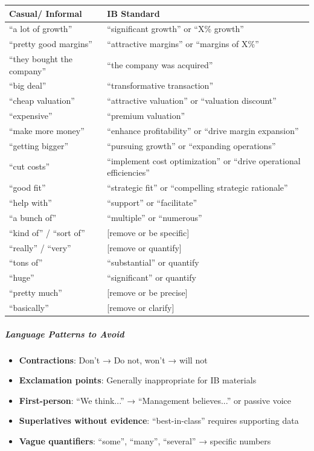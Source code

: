\documentclass[11pt]{article}
\begin{document}
\begingroup
\small
\setlength{\tabcolsep}{2pt}
\begin{longtable}{>{\RaggedRight\arraybackslash\hspace{0pt}}p{}>{\RaggedRight\arraybackslash\hspace{0pt}}p{}}
\toprule
{} \textbf{Casual/ Informal} & \textbf{IB Standard} \\
\midrule
{} ``a lot of growth'' & ``significant growth'' or ``X\% growth'' \\
{} ``pretty good margins'' & ``attractive margins'' or ``margins of X\%'' \\
{} ``they bought the company'' & ``the company was acquired'' \\
{} ``big deal'' & ``transformative transaction'' \\
{} ``cheap valuation'' & ``attractive valuation'' or ``valuation discount'' \\
{} ``expensive'' & ``premium valuation'' \\
{} ``make more money'' & ``enhance profitability'' or ``drive margin expansion'' \\
{} ``getting bigger'' & ``pursuing growth'' or ``expanding operations'' \\
{} ``cut costs'' & ``implement cost optimization'' or ``drive operational efficiencies'' \\
{} ``good fit'' & ``strategic fit'' or ``compelling strategic rationale'' \\
{} ``help with'' & ``support'' or ``facilitate'' \\
{} ``a bunch of'' & ``multiple'' or ``numerous'' \\
{} ``kind of'' /  ``sort of'' & [remove or be specific] \\
{} ``really'' /  ``very'' & [remove or quantify] \\
{} ``tons of'' & ``substantial'' or quantify \\
{} ``huge'' & ``significant'' or quantify \\
{} ``pretty much'' & [remove or be precise] \\
{} ``basically'' & [remove or clarify] \\
\bottomrule
\end{longtable}
\endgroup

\subparagraph{Language Patterns to Avoid}\mbox{}\par

\begin{itemize}[leftmargin=*,itemsep=2pt,topsep=2pt]
\item {} \textbf{Contractions}: Don't → Do not, won't → will not
\item {} \textbf{Exclamation points}: Generally inappropriate for IB materials
\item {} \textbf{First-person}: ``We think...'' → ``Management believes...'' or passive voice
\item {} \textbf{Superlatives without evidence}: ``best-in-class'' requires supporting data
\item {} \textbf{Vague quantifiers}: ``some'', ``many'', ``several'' → specific numbers
\end{itemize}
\end{document}
